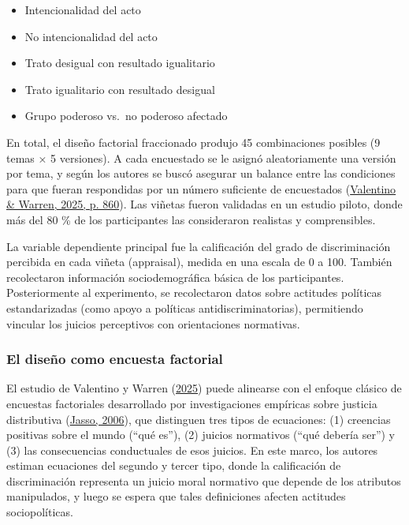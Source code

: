 \documentclass[
  13pt,
  a4paper,
]{article}
\providecommand{\tightlist}{%
  \setlength{\itemsep}{0pt}\setlength{\parskip}{0pt}}
\begin{document}
\begin{itemize}
\tightlist
\item
  Intencionalidad del acto\\
\item
  No intencionalidad del acto\\
\item
  Trato desigual con resultado igualitario\\
\item
  Trato igualitario con resultado desigual\\
\item
  Grupo poderoso vs.~no poderoso afectado
\end{itemize}

En total, el diseño factorial fraccionado produjo 45 combinaciones posibles (9 temas × 5 versiones). A cada encuestado se le asignó aleatoriamente una versión por tema, y según los autores se buscó asegurar un balance entre las condiciones para que fueran respondidas por un número suficiente de encuestados (\protect\hyperlink{ref-valentino_cultural_2025}{Valentino \& Warren, 2025, p. 860}). Las viñetas fueron validadas en un estudio piloto, donde más del 80 \% de los participantes las consideraron realistas y comprensibles.

La variable dependiente principal fue la calificación del grado de discriminación percibida en cada viñeta (appraisal), medida en una escala de 0 a 100. También recolectaron información sociodemográfica básica de los participantes. Posteriormente al experimento, se recolectaron datos sobre actitudes políticas estandarizadas (como apoyo a políticas antidiscriminatorias), permitiendo vincular los juicios perceptivos con orientaciones normativas.

\hypertarget{el-diseuxf1o-como-encuesta-factorial}{%
\subsubsection{El diseño como encuesta factorial}\label{el-diseuxf1o-como-encuesta-factorial}}

El estudio de Valentino y Warren (\protect\hyperlink{ref-valentino_cultural_2025}{2025}) puede alinearse con el enfoque clásico de encuestas factoriales desarrollado por investigaciones empíricas sobre justicia distributiva (\protect\hyperlink{ref-jasso_factorial_2006}{Jasso, 2006}), que distinguen tres tipos de ecuaciones: (1) creencias positivas sobre el mundo (``qué es''), (2) juicios normativos (``qué debería ser'') y (3) las consecuencias conductuales de esos juicios. En este marco, los autores estiman ecuaciones del segundo y tercer tipo, donde la calificación de discriminación representa un juicio moral normativo que depende de los atributos manipulados, y luego se espera que tales definiciones afecten actitudes sociopolíticas.
\end{document}
